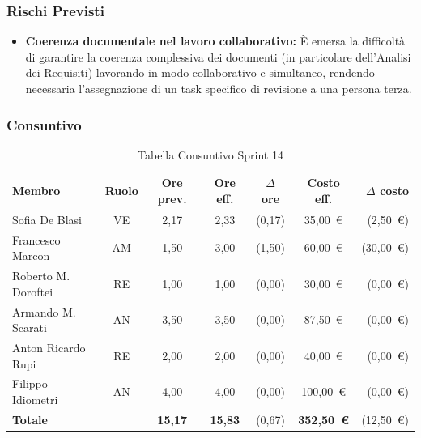 \subsubsection{Rischi Previsti}
\begin{itemize}
    \item \textbf{Coerenza documentale nel lavoro collaborativo:} È emersa la difficoltà di garantire la coerenza complessiva dei documenti (in particolare dell'Analisi dei Requisiti) lavorando in modo collaborativo e simultaneo, rendendo necessaria l'assegnazione di un task specifico di revisione a una persona terza.
\end{itemize}

\subsubsection{Consuntivo}
\begin{table}[H]
    \centering
    \renewcommand{\arraystretch}{1.3}
    \begin{tabularx}{\textwidth}{|X|c|c|c|c|c|r|}
        \hline
        \textbf{Membro} & \textbf{Ruolo} & \textbf{Ore prev.} &
        \textbf{Ore eff.} & \textbf{$\Delta$ ore} &
        \textbf{Costo eff.} & \textbf{$\Delta$ costo} \\
        \hline
        Sofia De Blasi       & VE & 2,17 & 2,33 & {\color{red}(0,17)}  & 35{,}00~\euro & {\color{red}(2{,}50~\euro)} \\
        Francesco Marcon     & AM & 1,50 & 3,00 & {\color{red}(1,50)}  & 60{,}00~\euro & {\color{red}(30{,}00~\euro)} \\
        Roberto M. Doroftei  & RE & 1,00 & 1,00 & {\color{green}(0,00)} & 30{,}00~\euro & {\color{green}(0{,}00~\euro)} \\
        Armando M. Scarati   & AN & 3,50 & 3,50 & {\color{green}(0,00)} & 87{,}50~\euro & {\color{green}(0{,}00~\euro)} \\
        Anton Ricardo Rupi   & RE & 2,00 & 2,00 & {\color{green}(0,00)} & 40{,}00~\euro & {\color{green}(0{,}00~\euro)} \\
        Filippo Idiometri    & AN & 4,00 & 4,00 & {\color{green}(0,00)} & 100{,}00~\euro & {\color{green}(0{,}00~\euro)} \\
        \hline
        \textbf{Totale} & & \textbf{15,17} & \textbf{15,83} & {\color{red}(0,67)} & \textbf{352{,}50~\euro} & {\color{red}(12{,}50~\euro)} \\
        \hline
    \end{tabularx}
    \caption{Tabella Consuntivo Sprint 14}
\end{table}

